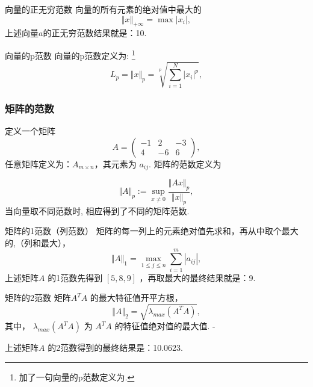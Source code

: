 \begin{defination}{向量的正无穷范数}
  向量的所有元素的绝对值中最大的
  \begin{equation}
    \label{eq:1.4.1.4}
\Vert {x}\Vert_{+\infty}=\max{|{x_i}|},    
\end{equation}
上述向量\( {a}\)的正无穷范数结果就是：10.
\end{defination}

\begin{defination}{向量的p范数}
  向量的p范数定义为:
  \footnote{加了一句向量的p范数定义为.}
\begin{equation}
  \label{eq:1.4.1.5} 
L_p=\Vert {x}\Vert_p=\sqrt[p]{\sum_{i=1}^{N}|{x_i}|^p}, 
\end{equation}  
\end{defination}

\subsubsection{矩阵的范数}
\label{sec:1.4.2}
定义一个矩阵
\begin{equation*}
  A=
  \begin{pmatrix}
    -1 & 2 & -3 \\
    4 & -6 & 6
  \end{pmatrix}
  ,
\end{equation*}
任意矩阵定义为：\(A_{m\times n}\)，其元素为 \(a_{ij}\).
矩阵的范数定义为

\begin{equation}
  \label{eq:1.4.2.1}
\Vert{A}\Vert_p :=\sup_{x\neq 0}\frac{\Vert{Ax}\Vert_p}{\Vert{x}\Vert_p},  
\end{equation}
当向量取不同范数时, 相应得到了不同的矩阵范数.

\begin{defination}{矩阵的1范数（列范数）}
  矩阵的每一列上的元素绝对值先求和，再从中取个最大的,（列和最大），
  \begin{equation}
    \label{eq:1.4.2.2}
\Vert A\Vert_1=\max_{1\le j\le n}\sum_{i=1}^m|{a_{ij}}|,    
  \end{equation}
  上述矩阵\(A\) 的1范数先得到 \([5,8,9]\) ，再取最大的最终结果就是：9.
\end{defination}


\begin{defination}{矩阵的2范数}
  矩阵\(A^TA\) 的最大特征值开平方根，
  \begin{equation}
    \label{eq:1.4.2.3}
\Vert A\Vert_2=\sqrt{\lambda_{max}(A^T A)},    
\end{equation}
其中， \(\lambda_{max}(A^T A)\) 为 \(A^T A​\) 的特征值绝对值的最大值. -

上述矩阵\(A\) 的2范数得到的最终结果是：10.0623.
\end{defination}


